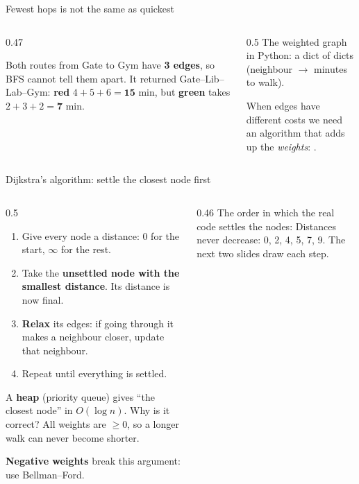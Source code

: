 \documentclass[aspectratio=169,10pt]{beamer}
\newcommand{\gA}{white}\newcommand{\gB}{white}\newcommand{\gC}{white}\newcommand{\gD}{white}\newcommand{\gE}{white}\newcommand{\gF}{white}
\newcommand{\campus}[1]{%
  \coordinate (pg) at (0,0); \coordinate (pl) at (2.6,1.5); \coordinate (pc) at (2.6,-1.5);
  \coordinate (pb) at (5.6,1.5); \coordinate (pd) at (5.6,-1.5); \coordinate (py) at (8.2,0);
  \ifnum#1=1
    \draw[tdInk!60] (pg) -- node[wl] {4} (pl); \draw[tdInk!60] (pg) -- node[wl] {2} (pc);
    \draw[tdInk!60] (pl) -- node[wl] {5} (pb); \draw[tdInk!60] (pl) -- node[wl,pos=0.3] {6} (pd);
    \draw[tdInk!60] (pc) -- node[wl] {3} (pd); \draw[tdInk!60] (pb) -- node[wl] {6} (py); \draw[tdInk!60] (pd) -- node[wl] {2} (py);
  \else
    \foreach \u/\v in {pg/pl,pg/pc,pl/pb,pl/pd,pc/pd,pb/py,pd/py}{\draw[tdInk!60] (\u) -- (\v);}
  \fi
  \node[gn,fill=\gA] (gate) at (pg) {Gate}; \node[gn,fill=\gB] (lib) at (pl) {Lib}; \node[gn,fill=\gC] (cafe) at (pc) {Cafe};
  \node[gn,fill=\gD] (lab) at (pb) {Lab}; \node[gn,fill=\gE] (dorm) at (pd) {Dorm}; \node[gn,fill=\gF] (gym) at (py) {Gym};}
\newcommand{\pycodes}[2]{}
\begin{document}
\begin{frame}{Fewest hops is not the same as quickest}
\begin{columns}[T]
\begin{column}{0.47\textwidth}
\begin{sfig}[0.52]
\end{sfig}
{\small
Both routes from Gate to Gym have \textbf{3 edges}, so BFS cannot tell them apart. It returned Gate--Lib--Lab--Gym:
\textcolor{tdRed}{\textbf{red}} $4+5+6=\textbf{15}$ min, but \textcolor{tdGreen!70!black}{\textbf{green}} takes $2+3+2=\textbf{7}$ min.}
\end{column}
\begin{column}{0.5\textwidth}
{\small The weighted graph in Python: a dict of dicts (neighbour $\to$ minutes to walk).}
\vspace{1mm}
\pycodes{\fontsize{7.4}{9}}{weighted}
\vspace{2mm}
{\small
When edges have different costs we need an algorithm that adds up the \emph{weights}: .}
\end{column}
\end{columns}
\end{frame}

\begin{frame}{Dijkstra's algorithm: settle the closest node first}
\begin{columns}[T]
\begin{column}{0.5\textwidth}
{\small
\begin{enumerate}\setlength\itemsep{3pt}
\item Give every node a distance: 0 for the start, $\infty$ for the rest.
\item Take the \textbf{unsettled node with the smallest distance}. Its distance is now final.
\item \textbf{Relax} its edges: if going through it makes a neighbour closer, update that neighbour.
\item Repeat until everything is settled.
\end{enumerate}
\vspace{1mm}
A \textbf{heap} (priority queue) gives ``the closest node'' in $O(\log n)$. Why is it correct? All weights are $\ge 0$, so a longer walk can never become shorter.

\vspace{1mm}
\textbf{Negative weights} break this argument: use Bellman--Ford.}
\end{column}
\begin{column}{0.46\textwidth}
{\small The order in which the real code settles the nodes:}
\vspace{2mm}
{\small Distances never decrease: 0, 2, 4, 5, 7, 9. The next two slides draw each step.}
\end{column}
\end{columns}
\end{frame}
\end{document}
